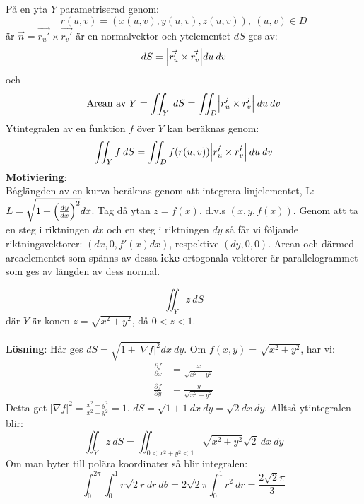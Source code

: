 \documentclass{report}
\begin{document}
{
På en yta $ Y $ parametriserad genom:
\begin{equation*}
r(u,v) = (x(u,v), y(u,v), z(u,v)), \:(u,v) \in D
\end{equation*}
är $ \vec{n} = \vec{r_u'} \times \vec{r_v'}   $ är en normalvektor och ytelementet $ dS $ ges av:
\begin{equation*}
dS = \Bigl| \vec{r_u'} \times \vec{r_v'}  \Bigr| du\:dv
\end{equation*}
och
\begin{equation*}
\text{Arean av } Y = \iint_{Y}^{}  \: dS = \iint_{D}^{} \Bigl| \vec{r_u'} \times \vec{r_v'}  \Bigr| \: du   \: dv 
\end{equation*}
Ytintegralen av en funktion $ f $ över $ Y $ kan beräknas genom:
\begin{equation*}
\iint_{Y}^{} f \: dS = \iint_{D}^{} f(r(u,v))\Bigl| \vec{r_u'} \times \vec{r_v'}  \Bigr| \: du   \: dv 
\end{equation*}
\textbf{Motiviering}:\\
Båglängden av en kurva beräknas genom att integrera linjelementet, L: $ L = \sqrt{1 + \Bigl( \frac{dy}{dx}  \Bigr)^2 } dx $. Tag då ytan $ z = f(x)$, d.v.s $ (x,y,f(x)) $. Genom att ta en steg i riktningen $ dx $ och en steg i riktningen $ dy $ så får vi följande riktningsvektorer: $ (dx,0,f'(x)dx) $, respektive $ (dy,0,0) $. Arean och därmed areaelementet som spänns av dessa \textbf{icke} ortogonala vektorer är parallelogrammet som ges av längden av dess normal.   
}

{
\begin{equation*}
\iint_{Y}^{} z \: dS 
\end{equation*}
där $ Y $ är konen $ z = \sqrt{x^2+y^2}  $, då $ 0 < z < 1 $.\\\\

\textbf{Lösning}:
Här ges $ dS = \sqrt{1 + \bigl|  \nabla f \bigr|^2} dx\:dy $. Om $ f(x,y) = \sqrt{x^2+y^2}  $, har vi:
\begin{align*}
	\frac{\partial f }{\partial x } &= \frac{x}{ \sqrt{x^2+y^2}  }\\
	\frac{\partial f }{\partial y } &= \frac{y}{ \sqrt{x^2+y^2} } 
\end{align*}
Detta get $ \bigl| \nabla f \bigr|^2 = \frac{x^2+y^2}{ x^2+y^2 } = 1$. $ dS = \sqrt{1 + 1} dx\:dy = \sqrt{2} dx\:dy $. Alltså ytintegralen blir:
\begin{equation*}
	\iint_{Y}^{} z \: dS = \iint_{0 < x^2+y^2 < 1}^{} \sqrt{x^2+y^2} \sqrt{2}   \: dx   \: dy 
\end{equation*}
Om man byter till polära koordinater så blir integralen:
\begin{equation*}
\int_{0}^{2\pi} \int_{0}^{1} r \sqrt{2} r \: dr  \: d\theta = 2 \sqrt{2} \pi \int_{0}^{1} r^2 \: dr = \frac{2 \sqrt{2} \pi}{3}   
\end{equation*}
}
\end{document}
